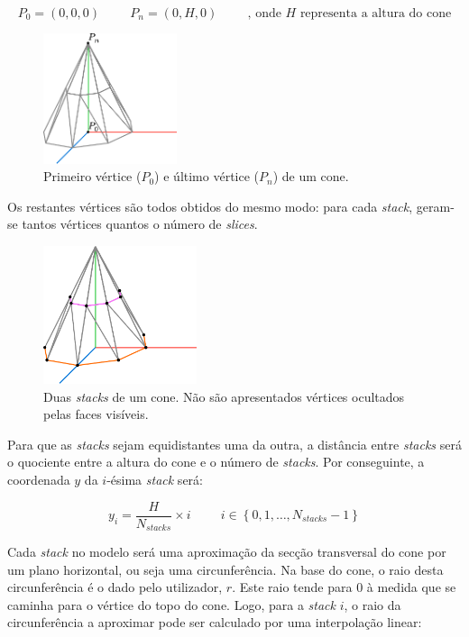 \documentclass[12pt, a4paper]{article}
\begin{document}
$$
P_0 = (0, 0, 0)
\hspace{1cm}
P_n = (0, H, 0)
\hspace{1cm}
\text{, onde $H$ representa a altura do cone}
$$

\begin{figure}[H]
    \centering
    \includegraphics[width=0.35\textwidth]{res/figures/Cone1.pdf}
    \caption{Primeiro vértice ($P_0$) e último vértice ($P_n$) de um cone.}
\end{figure}

Os restantes vértices são todos obtidos do mesmo modo: para cada \emph{stack}, geram-se tantos
vértices quantos o número de \emph{slices}.

\begin{figure}[H]
    \centering
    \includegraphics[width=0.4\textwidth]{res/figures/Cone2.pdf}
    \caption{
        Duas \emph{stacks} de um cone. Não são apresentados vértices ocultados pelas faces visíveis.
    }
\end{figure}

Para que as \emph{stacks} sejam equidistantes uma da outra, a distância entre \emph{stacks} será
o quociente entre a altura do cone e o número de \emph{stacks}. Por conseguinte, a coordenada $y$ da
$i$-ésima \emph{stack} será:

$$
y_i = \frac{H}{N_{stacks}} \times i
\hspace{1cm}
i \in \left \lbrace 0, 1, \ldots, N_{stacks} - 1 \right \rbrace
$$

Cada \emph{stack} no modelo será uma aproximação da secção transversal do cone por um plano
horizontal, ou seja uma circunferência. Na base do cone, o raio desta circunferência é o dado pelo
utilizador, $r$. Este raio tende para 0 à medida que se caminha para o vértice do topo do cone.
Logo, para a \emph{stack} $i$, o raio da circunferência a aproximar pode ser calculado por uma
interpolação linear:
\end{document}
